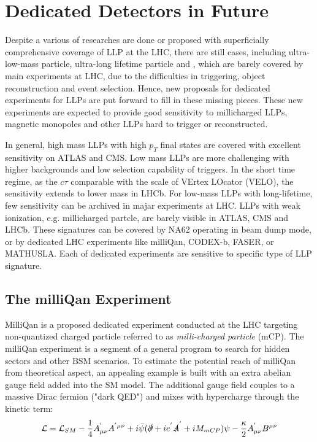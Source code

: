 \section{Dedicated Detectors in Future}

Despite a various of researches are done or proposed with superficially comprehensive coverage of LLP at the LHC, there are still cases, including ultra-low-mass particle, ultra-long lifetime particle and , which are barely covered by main experiments at LHC, due to the difficulties in triggering, object reconstruction and event selection. Hence, new proposals for dedicated experiments for LLPs are put forward to fill in these missing pieces. These new experiments are expected to provide good sensitivity to millicharged LLPs, magnetic monopoles and other LLPs hard to trigger or reconstructed.

In general, high mass LLPs with high $p_T$ final states are covered with excellent sensitivity on ATLAS and CMS. Low mass LLPs are more challenging with higher backgrounds and low selection capability of triggers. In the short time regime, as the $c\tau$ comparable with the scale of VErtex LOcator (VELO), the sensitivity extends to lower mass in LHCb. For low-mass LLPs with long-lifetime, few sensitivity can be archived in majar experiments at LHC. LLPs with weak ionization, e.g. millicharged partcle, are barely visible in ATLAS, CMS and LHCb. These signatures can be covered by NA62 operating in beam dump mode, or by dedicated LHC experiments like milliQan, CODEX-b, FASER, or MATHUSLA. Each of dedicated experiments are sensitive to specific type of LLP signature.

\subsection{The milliQan Experiment}

MilliQan is a proposed dedicated experiment conducted at the LHC targeting non-quantized charged particle referred to as \textit{milli-charged particle} (mCP). The milliQan experiment is a segment of a general program to search for hidden sectors and other BSM scenarios. To estimate the potential reach of milliQan from theoretical aspect, an appealing example is built with an extra abelian gauge field added into the SM model. The additional gauge field couples to a massive Dirac fermion ("dark QED") and mixes with hypercharge through the kinetic term:
\begin{equation}
\mathcal{L} = \mathcal{L}_{SM}-\frac{1}{4}A_{\mu\nu}^{'}A^{'\mu\nu}+i\bar{\psi}(\slashed{\partial}+ie^{'}\slashed{A}^{'}+ iM_{mCP})\psi-\frac{\kappa}{2}A^{'}_{\mu\nu}B^{\mu\nu}
\end{equation}

